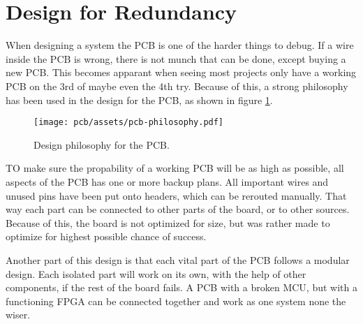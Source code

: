 \section{Design for Redundancy}

When designing a system the PCB is one of the harder things to debug.
If a wire inside the PCB is wrong, there is not munch that can be done, except buying a new PCB.
This becomes apparant when seeing most projects only have a working PCB on the 3rd of maybe even the 4th try.
Because of this, a strong philosophy has been used in the design for the PCB, as shown in figure \ref{fig:pcb_philosophy}.

\begin{figure}[H]
    \centering
        \texttt{[image: pcb/assets/pcb-philosophy.pdf]}
    \caption{Design philosophy for the PCB.}
    \label{fig:pcb_philosophy}
\end{figure}

TO make sure the propability of a working PCB will be as high as possible, all aspects of the PCB has one or more backup plans.
All important wires and unused pins have been put onto headers, which can be rerouted manually.
That way each part can be connected to other parts of the board, or to other sources.
Because of this, the board is not optimized for size, but was rather made to optimize for highest possible chance of success.

Another part of this design is that each vital part of the PCB follows a modular design.
Each isolated part will work on its own, with the help of other components, if the rest of the board fails.
A PCB with a broken MCU, but with a functioning FPGA can be connected together and work as one system none the wiser.
